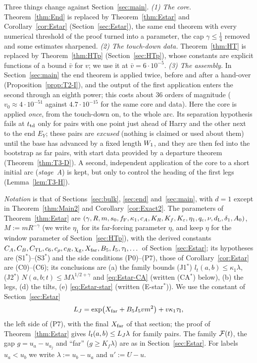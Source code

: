 Three things change against Section~\ref{sec:main}.
\emph{(1) The core.} Theorem~\ref{thm:End} is replaced by Theorem~\ref{thm:Estar} and Corollary~\ref{cor:Estar}
(Section~\ref{sec:Estar}), the same end theorem with every numerical threshold of the proof turned into a parameter, the cap
$\gamma\le\frac14$ removed and some estimates sharpened.
\emph{(2) The touch-down data.} Theorem~\ref{thm:HT} is replaced by Theorem~\ref{thm:HTp} (Section~\ref{sec:HTp}), whose
constants are explicit functions of a bound $\bar v$ for $v$; we use it at $\bar v=6\cdot10^{-5}$.
\emph{(3) The assembly.} In Section~\ref{sec:main} the end theorem is applied twice, before and after a hand-over
(Proposition~\ref{prop:T2-I}), and the output of the first application enters the second through an eighth power; this costs
about $36$ orders of magnitude ($v_0\approx4\cdot10^{-51}$ against $4.7\cdot10^{-15}$ for the same core and data). Here the core is applied \emph{once}, from the touch-down on, to the whole arc. Its separation
hypothesis fails at $t_{\mathrm{td}}$ only for pairs with one point just ahead of Harry and the other next to the end $E_Y$; these pairs
are \emph{excused} (nothing is claimed or used about them) until the base has advanced by a fixed length $W_1$, and they are
then fed into the bootstrap as far pairs, with start data provided by a departure theorem (Theorem~\ref{thm:T3-D}). A second,
independent application of the core to a short initial arc (\emph{stage~A}) is kept, but only to control the heading of the
first legs (Lemma~\ref{lem:T3-H}).

\emph{Notation} is that of Sections~\ref{sec:bulk}, \ref{sec:end} and~\ref{sec:main}, with $d=1$ except in
Theorem~\ref{thm:Main2} and Corollary~\ref{cor:Exact2}. The parameters of Theorem~\ref{thm:Estar} are
$(\gamma,R,m,s_0,f_{\mathrm F},\kappa_1,c_A,K_R,K_f,K_\varepsilon,\eta_1,q_{\mathrm c},\nu,d_{\mathrm L},\delta_1,A_0)$, $M:=mR^{-\gamma}$ (we write
$\eta_1$ for its far-forcing parameter $\eta$, and keep $\eta$ for the window parameter of Section~\ref{sec:HTp}), with the
derived constants $C_A,C_B,C_{\mathrm{TL}},c_6,c_\rho,c_R,\chi_{\mathrm g},X_{\mathrm{far}},B_5,I_5,\tau_{\mathrm I},\dots$ of Section~\ref{sec:Estar}; its
hypotheses are (S1$^*$)--(S3$^*$) and the side conditions (P0)--(P7), those of Corollary~\ref{cor:Estar} are (C0)--(C6); its
conclusions are (a) the family bounds (J1$^*$) $l_t(a,b)\le\kappa_1\lambda$, (J2$^*$) $N(a,b;t)\le M\lambda^{1/2+\gamma}$ and
\eqref{eq:Estar-CA} (written (CA$^*$) below), (b) the legs, (d) the tilts, (e) \eqref{eq:Estar-star} (written (E-star$^*$)). We use
the constant of Section~\ref{sec:Estar}
\begin{equation}\label{eq:T3-LJ}
L_J=\exp\bigl(X_{\mathrm{far}}+B_5I_5vm^2\bigr)+v\kappa_1\tau_{\mathrm I},
\end{equation}
the left side of (P7), with the final $X_{\mathrm{far}}$ of that section; the proof of Theorem~\ref{thm:Estar} gives $l_t(a,b)\le L_J\lambda$ for family pairs. The family $\mathcal F(t)$,
the gap $g=u_a-u_{a_j}$ and ``far'' ($g\ge K_f\lambda$) are as in Section~\ref{sec:Estar}. For labels $u_a<u_b$ we write
$\lambda:=u_b-u_a$ and $u':=U-u$.

